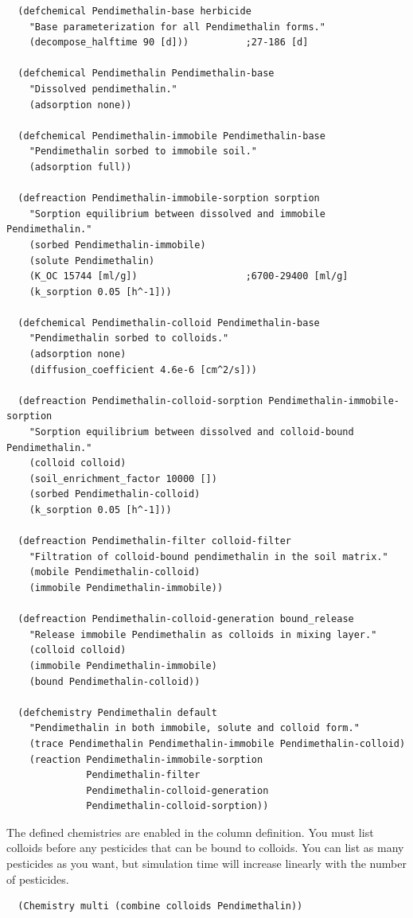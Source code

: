 \documentclass[a4paper]{article}
\begin{document}
\begin{verbatim}
  (defchemical Pendimethalin-base herbicide
    "Base parameterization for all Pendimethalin forms."
    (decompose_halftime 90 [d]))          ;27-186 [d]
  
  (defchemical Pendimethalin Pendimethalin-base
    "Dissolved pendimethalin."
    (adsorption none))
  
  (defchemical Pendimethalin-immobile Pendimethalin-base
    "Pendimethalin sorbed to immobile soil."
    (adsorption full))
  
  (defreaction Pendimethalin-immobile-sorption sorption
    "Sorption equilibrium between dissolved and immobile Pendimethalin."
    (sorbed Pendimethalin-immobile)
    (solute Pendimethalin)
    (K_OC 15744 [ml/g])                   ;6700-29400 [ml/g]
    (k_sorption 0.05 [h^-1]))
  
  (defchemical Pendimethalin-colloid Pendimethalin-base
    "Pendimethalin sorbed to colloids."
    (adsorption none)
    (diffusion_coefficient 4.6e-6 [cm^2/s]))
  
  (defreaction Pendimethalin-colloid-sorption Pendimethalin-immobile-sorption
    "Sorption equilibrium between dissolved and colloid-bound Pendimethalin."
    (colloid colloid)
    (soil_enrichment_factor 10000 [])
    (sorbed Pendimethalin-colloid)
    (k_sorption 0.05 [h^-1]))
  
  (defreaction Pendimethalin-filter colloid-filter
    "Filtration of colloid-bound pendimethalin in the soil matrix."
    (mobile Pendimethalin-colloid)
    (immobile Pendimethalin-immobile))
  
  (defreaction Pendimethalin-colloid-generation bound_release
    "Release immobile Pendimethalin as colloids in mixing layer."
    (colloid colloid)
    (immobile Pendimethalin-immobile)
    (bound Pendimethalin-colloid))
  
  (defchemistry Pendimethalin default
    "Pendimethalin in both immobile, solute and colloid form."
    (trace Pendimethalin Pendimethalin-immobile Pendimethalin-colloid)
    (reaction Pendimethalin-immobile-sorption
              Pendimethalin-filter 
              Pendimethalin-colloid-generation
              Pendimethalin-colloid-sorption))
\end{verbatim}

The defined chemistries are enabled in the column definition.  You
must list colloids before any pesticides that can be bound to
colloids.  You can list as many pesticides as you want, but simulation
time will increase linearly with the number of pesticides.
\begin{verbatim}
  (Chemistry multi (combine colloids Pendimethalin))
\end{verbatim}


\end{document}
